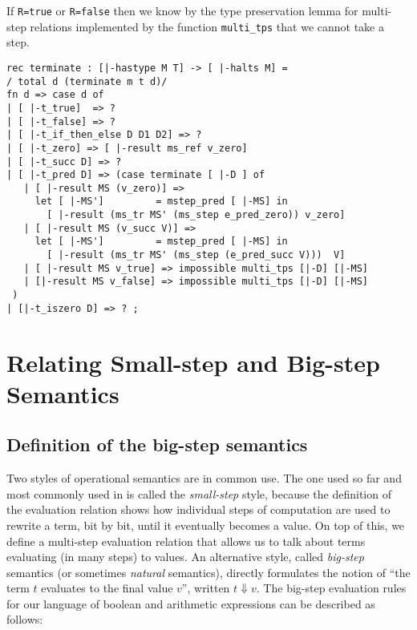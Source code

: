 If \lstinline!R=true! or \lstinline!R=false! then we know by the type
preservation lemma for multi-step relations implemented by the
function \lstinline!multi_tps! that we cannot take a step.



\begin{lstlisting}
rec terminate : [|-hastype M T] -> [ |-halts M] =
/ total d (terminate m t d)/
fn d => case d of
| [ |-t_true]  => ?
| [ |-t_false] => ?
| [ |-t_if_then_else D D1 D2] => ?
| [ |-t_zero] => [ |-result ms_ref v_zero]
| [ |-t_succ D] => ?
| [ |-t_pred D] => (case terminate [ |-D ] of
   | [ |-result MS (v_zero)] =>
     let [ |-MS']         = mstep_pred [ |-MS] in
       [ |-result (ms_tr MS' (ms_step e_pred_zero)) v_zero]
   | [ |-result MS (v_succ V)] =>
     let [ |-MS']         = mstep_pred [ |-MS] in
       [ |-result (ms_tr MS' (ms_step (e_pred_succ V)))  V]
   | [ |-result MS v_true] => impossible multi_tps [|-D] [|-MS] 
   | [|-result MS v_false] => impossible multi_tps [|-D] [|-MS] 
 )
| [|-t_iszero D] => ? ;
\end{lstlisting}


\section{Relating Small-step and Big-step Semantics}

\subsection{Definition of the big-step semantics}

Two styles of operational semantics are in common use. The one used so far and
most commonly used in \cite{TAPL} is called the {\em small-step} style, because the definition of the
evaluation relation shows how individual steps of computation are used to
rewrite a term, bit by bit, until it eventually becomes a value. On top of this,
we define a multi-step evaluation relation that allows us to talk about terms
evaluating (in many steps) to values. An alternative style, called
{\em big-step} semantics (or sometimes {\em natural} semantics), directly
formulates the notion of ``the term $t$ evaluates to the final value $v$'', written
$t \Downarrow v$. The big-step evaluation rules for our language of boolean and
arithmetic expressions can be described as follows:

